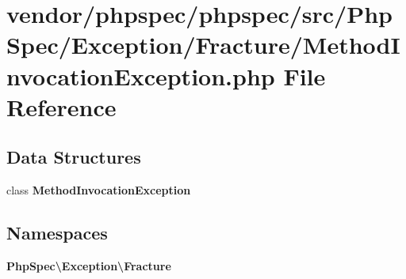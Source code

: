 \section{vendor/phpspec/phpspec/src/\+Php\+Spec/\+Exception/\+Fracture/\+Method\+Invocation\+Exception.php File Reference}
\label{_method_invocation_exception_8php}
\subsection*{Data Structures}
\begin{DoxyCompactItemize}
\item 
class {\bf Method\+Invocation\+Exception}
\end{DoxyCompactItemize}
\subsection*{Namespaces}
\begin{DoxyCompactItemize}
\item 
 {\bf Php\+Spec\textbackslash{}\+Exception\textbackslash{}\+Fracture}
\end{DoxyCompactItemize}

